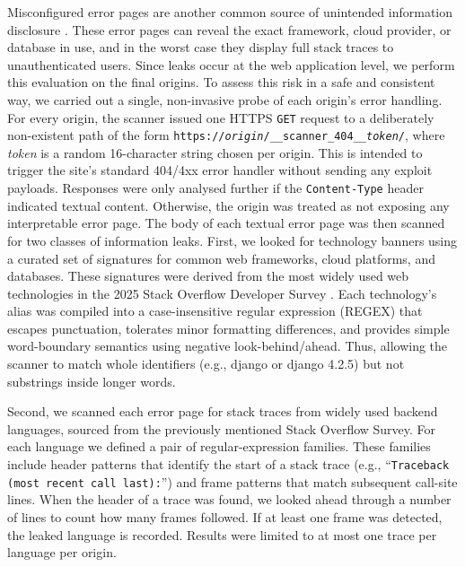 \documentclass[pdflatex,sn-mathphys-num]{sn-jnl}
\numberwithin{equation}{section}
\theoremstyle{thmstyleone}
\theoremstyle{thmstyletwo}%
\theoremstyle{thmstylethree}%
\begin{document}
\vspace{1em}Misconfigured error pages are another common source of unintended information disclosure 
\cite{owasp_top10_a05_2021,owasp_error_handling,cwe_209}. These error pages can reveal the exact framework, cloud provider, or 
database in use, and in the worst case they display full stack traces to unauthenticated users. Since leaks occur at the web application level, we perform this evaluation
on the final origins. To assess this risk in a safe and consistent way, we carried out a
single, non-invasive probe of each origin's error handling. For every origin, the scanner issued one HTTPS \texttt{GET} request to a deliberately non-existent path of the form 
\texttt{https://\textit{origin}/\_\_scanner\_404\_\_\textit{token}/}, where \textit{token} is a 
random 16-character string chosen per origin. This is
intended to trigger the site's standard 404/4xx error handler without sending any exploit payloads. 
Responses were only analysed further if the \texttt{Content-Type} header indicated textual 
content. 
Otherwise, the origin was treated as not exposing any interpretable error page. The body of each textual error page was then scanned for two classes of
information leaks. First, we looked for technology banners using a curated set of signatures for common web frameworks, cloud platforms, and databases. These signatures
were derived from the most widely used web technologies in the 2025 Stack Overflow Developer Survey \cite{stackoverflow_survey_2025}. 
Each technology's alias was compiled into a case-insensitive regular expression (REGEX) that escapes punctuation, tolerates 
minor formatting differences, and provides simple word-boundary semantics using negative look-behind/ahead. Thus, allowing the scanner to match whole 
identifiers (e.g., django or django 4.2.5) but not substrings inside longer words.

\vspace{1em}Second, we scanned each error page for stack traces from widely used backend languages, sourced from the previously mentioned Stack Overflow Survey. For
each language we defined a pair of regular-expression families. These families include header patterns
that identify the start of a stack trace (e.g., ``\texttt{Traceback (most recent call last):}'') and frame patterns that match subsequent call-site lines. 
When the header of a trace was found, we looked ahead through a number of lines to count how many frames followed. If at least one frame was detected, 
the leaked language is recorded. Results were limited to at most one trace per language per origin.
\end{document}
